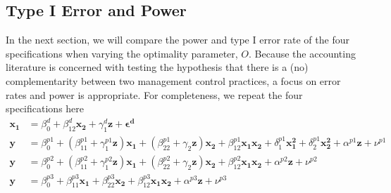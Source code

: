 \documentclass[12pt]{article}
\begin{document}
\subsection{Type I Error and Power}
In the next section, we will compare the power and type I error rate of the four specifications when varying the optimality parameter, $O$. Because the accounting literature is concerned with testing the hypothesis that there is a (no) complementarity between two management control practices, a focus on error rates and power is appropriate. For completeness, we repeat the four specifications here
\begin{align*} 
\mathbf{x_1} &= \beta_0^d + \beta_{12}^d \mathbf{x_2} 
        + \gamma_{1}^d \mathbf{z}
        + \mathbf{\epsilon^d} \\
\mathbf{y} &=  \beta^{p1}_0 + (\beta^{p1}_{11} + \gamma_1^{p1} \mathbf{z} )\mathbf{x_1} 
						+ (\beta_{22}^{p1} + \gamma_2 \mathbf{z} ) \mathbf{x_2} 
                        + \beta_{12}^{p1} \mathbf{x_1} \mathbf{x_2} 
                        + \delta_1^{p1} \mathbf{x^2_1} + \delta_2^{p1} \mathbf{x^2_2} 
                        + \alpha^{p1} \mathbf{z}
                        + \nu^{p1} \\
 \mathbf{y} &=  \beta^{p2}_0 + (\beta^{p2}_{11} + \gamma_1^{p2} \mathbf{z} )\mathbf{x_1} 
						+ (\beta_{22}^{p2} + \gamma_2 \mathbf{z} ) \mathbf{x_2} 
                        + \beta_{12}^{p2} \mathbf{x_1} \mathbf{x_2} 
                        + \alpha^{p2} \mathbf{z}
                        + \nu^{p2} \\
 \mathbf{y} &=  \beta^{p3}_0 + \beta^{p3}_{11} \mathbf{x_1} 
						+ \beta_{22}^{p3} \mathbf{x_2} 
                        + \beta_{12}^{p3} \mathbf{x_1} \mathbf{x_2} 
                        + \alpha^{p3} \mathbf{z}
                        + \nu^{p3}
\end{align*}
\end{document}
